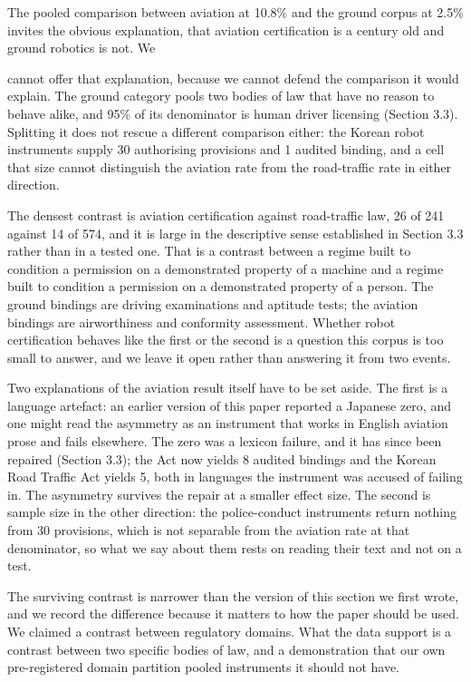 The pooled comparison between aviation at 10.8\% and the ground corpus at 2.5\% invites the obvious explanation, that aviation certification is a century old and ground robotics is not. We

cannot offer that explanation, because we cannot defend the comparison it would explain. The ground category pools two bodies of law that have no reason to behave alike, and 95\% of its denominator is human driver licensing (Section 3.3). Splitting it does not rescue a different comparison either: the Korean robot instruments supply 30 authorising provisions and 1 audited binding, and a cell that size cannot distinguish the aviation rate from the road-traffic rate in either direction.

The densest contrast is aviation certification against road-traffic law, 26 of 241 against 14 of 574, and it is large in the descriptive sense established in Section 3.3 rather than in a tested one. That is a contrast between a regime built to condition a permission on a demonstrated property of a machine and a regime built to condition a permission on a demonstrated property of a person. The ground bindings are driving examinations and aptitude tests; the aviation bindings are airworthiness and conformity assessment. Whether robot certification behaves like the first or the second is a question this corpus is too small to answer, and we leave it open rather than answering it from two events.

Two explanations of the aviation result itself have to be set aside. The first is a language artefact: an earlier version of this paper reported a Japanese zero, and one might read the asymmetry as an instrument that works in English aviation prose and fails elsewhere. The zero was a lexicon failure, and it has since been repaired (Section 3.3); the Act now yields 8 audited bindings and the Korean Road Traffic Act yields 5, both in languages the instrument was accused of failing in. The asymmetry survives the repair at a smaller effect size. The second is sample size in the other direction: the police-conduct instruments return nothing from 30 provisions, which is not separable from the aviation rate at that denominator, so what we say about them rests on reading their text and not on a test.

The surviving contrast is narrower than the version of this section we first wrote, and we record the difference because it matters to how the paper should be used. We claimed a contrast between regulatory domains. What the data support is a contrast between two specific bodies of law, and a demonstration that our own pre-registered domain partition pooled instruments it should not have.

